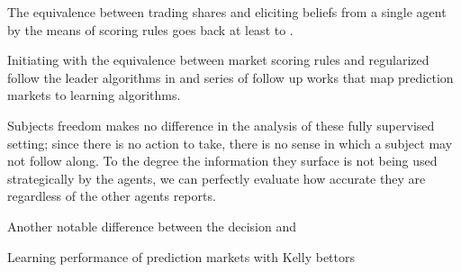 The equivalence between trading shares and eliciting beliefs from a single agent by the means of scoring rules goes back at least to \cite{savage1971elicitation}. 





Initiating with the equivalence between market scoring rules and regularized follow the leader algorithms in \cite{chen2010new} and series of follow up works \cite{abernethy2013efficient, frongillo2012interpreting, hu2014multi, frongillo2015convergence,} that map prediction markets to learning algorithms. 

Subjects freedom makes no difference in the analysis of these fully supervised setting; since there is no action to take, there is no sense in which a subject may not follow along. To the degree the information they surface is not being used strategically by the agents, we can perfectly evaluate how accurate they are regardless of the other agents reports.





Another notable difference between the decision and 

Learning performance of prediction markets with Kelly bettors\cite{beygelzimer2012learning}

